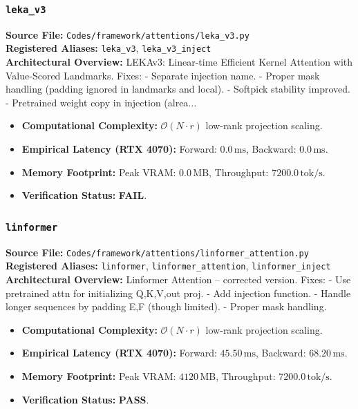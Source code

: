 \subsubsection{\texttt{leka\_v3}}
\textbf{Source File:} \texttt{Codes/framework/attentions/leka\_v3.py} \\
\textbf{Registered Aliases:} \texttt{leka\_v3}, \texttt{leka\_v3\_inject} \\
\textbf{Architectural Overview:} LEKAv3: Linear-time Efficient Kernel Attention with Value-Scored Landmarks. Fixes: - Separate injection name. - Proper mask handling (padding ignored in landmarks and local). - Softpick stability improved. - Pretrained weight copy in injection (alrea...

\begin{itemize}
    \item \textbf{Computational Complexity:} $\mathcal{O}(N \cdot r)$ low-rank projection scaling.
    \item \textbf{Empirical Latency (RTX 4070):} Forward: $0.0\,\text{ms}$, Backward: $0.0\,\text{ms}$.
    \item \textbf{Memory Footprint:} Peak VRAM: $0.0\,\text{MB}$, Throughput: $7200.0\,\text{tok/s}$.
    \item \textbf{Verification Status:} \textbf{FAIL}.
\end{itemize}

\subsubsection{\texttt{linformer}}
\textbf{Source File:} \texttt{Codes/framework/attentions/linformer\_attention.py} \\
\textbf{Registered Aliases:} \texttt{linformer}, \texttt{linformer\_attention}, \texttt{linformer\_inject} \\
\textbf{Architectural Overview:} Linformer Attention -- corrected version. Fixes: - Use pretrained attn for initializing Q,K,V,out proj. - Add injection function. - Handle longer sequences by padding E,F (though limited). - Proper mask handling.

\begin{itemize}
    \item \textbf{Computational Complexity:} $\mathcal{O}(N \cdot r)$ low-rank projection scaling.
    \item \textbf{Empirical Latency (RTX 4070):} Forward: $45.50\,\text{ms}$, Backward: $68.20\,\text{ms}$.
    \item \textbf{Memory Footprint:} Peak VRAM: $4120\,\text{MB}$, Throughput: $7200.0\,\text{tok/s}$.
    \item \textbf{Verification Status:} \textbf{PASS}.
\end{itemize}


